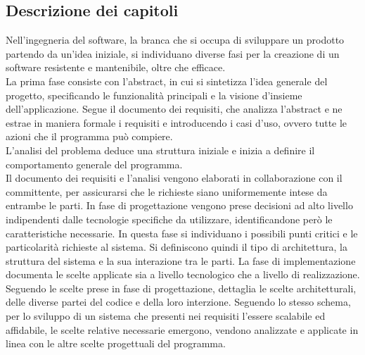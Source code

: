\clearpage
{}
\subsection*{Descrizione dei capitoli}

Nell'ingegneria del software, la branca che si occupa di sviluppare un prodotto partendo da un'idea iniziale, 
si individuano diverse fasi per la creazione di un software resistente e mantenibile, oltre che efficace.\\

    La prima fase consiste con l'abstract, in cui si sintetizza l'idea generale del progetto, 
    specificando le funzionalità principali e la visione d'insieme dell'applicazione.
    Segue il documento dei requisiti, che analizza l'abstract e ne estrae in maniera formale i requisiti e introducendo i casi d'uso, 
    ovvero tutte le azioni che il programma può compiere.\\
    L'analisi del problema deduce una struttura iniziale e inizia a definire il comportamento generale del programma.\\
    Il documento dei requisiti e l'analisi vengono elaborati in collaborazione con il committente, 
    per assicurarsi che le richieste siano uniformemente intese da entrambe le parti.
    In fase di progettazione vengono prese decisioni ad alto livello indipendenti dalle tecnologie specifiche da utilizzare, 
    identificandone però le caratteristiche necessarie. 
    In questa fase si individuano i possibili punti critici e le particolarità richieste al sistema.
    Si definiscono quindi il tipo di architettura, la struttura del sistema e la sua interazione tra le parti.
    La fase di implementazione documenta le scelte applicate sia a livello tecnologico che a livello di realizzazione. 
    Seguendo le scelte prese in fase di progettazione, dettaglia le scelte architetturali, delle diverse partei del codice e della loro interzione.
Seguendo lo stesso schema, per lo sviluppo di un sistema che presenti nei requisiti l'essere scalabile ed affidabile, 
le scelte relative necessarie emergono, vendono analizzate e applicate in linea con le altre scelte progettuali del programma.\\
\clearpage
